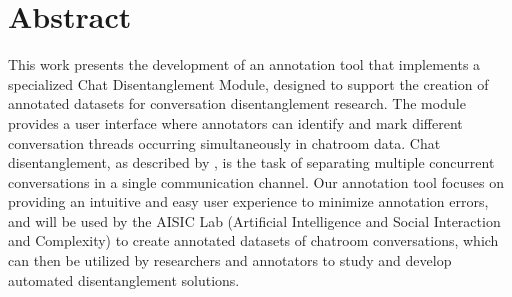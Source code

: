 \chapter*{Abstract}

This work presents the development of an annotation tool that implements a specialized Chat Disentanglement Module, designed to support the creation of annotated datasets for conversation disentanglement research. The module provides a user interface where annotators can identify and mark different conversation threads occurring simultaneously in chatroom data. Chat disentanglement, as described by \textcite{elsner2010disentangling}, is the task of separating multiple concurrent conversations in a single communication channel. Our annotation tool focuses on providing an intuitive and easy user experience to minimize annotation errors, and will be used by the AISIC Lab (Artificial Intelligence and Social Interaction and Complexity) to create annotated datasets of chatroom conversations, which can then be utilized by researchers and annotators to study and develop automated disentanglement solutions.